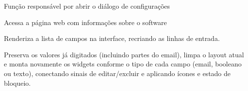 \documentclass[letterpaper,10pt,english]{sphinxmanual}
\begin{document}
\begin{fulllineitems}
\begin{fulllineitems}
\label{\detokenize{api/app:app.App.open_settings}}
\pysigstartsignatures
\pysiglinewithargsret
{}
{}
{}
\pysigstopsignatures
\sphinxAtStartPar
Função responsável por abrir o diálogo de configurações
\begin{quote}\begin{description}
\sphinxAtStartPar
{}

\end{description}\end{quote}

\end{fulllineitems}


\begin{fulllineitems}
\label{\detokenize{api/app:app.App.open_help}}
\pysigstartsignatures
\pysiglinewithargsret
{}
{}
{}
\pysigstopsignatures
\sphinxAtStartPar
Acessa a página web com informações sobre o software
\begin{quote}\begin{description}
\sphinxAtStartPar
{}

\end{description}\end{quote}

\end{fulllineitems}


\begin{fulllineitems}
\label{\detokenize{api/app:app.App.render_fields}}
\pysigstartsignatures
\pysiglinewithargsret
{}
{}
{}
\pysigstopsignatures
\sphinxAtStartPar
Renderiza a lista de campos na interface, recriando as linhas de entrada.

\sphinxAtStartPar
Preserva os valores já digitados (incluindo partes do e\sphinxhyphen{}mail), limpa o layout
atual e monta novamente os widgets conforme o tipo de cada campo (email,
booleano ou texto), conectando sinais de editar/excluir e aplicando ícones e
estado de bloqueio.
\begin{quote}\begin{description}
\sphinxAtStartPar
{}


\end{description}
\end{quote}
\end{fulllineitems}
\end{fulllineitems}
\end{document}

